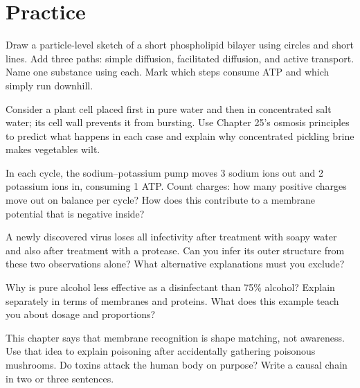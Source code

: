 \section*{Practice}

\begin{sikaoti}
\item Draw a particle-level sketch of a short phospholipid bilayer using circles and short lines. Add three paths: simple diffusion, facilitated diffusion, and active transport. Name one substance using each. Mark which steps consume ATP and which simply run downhill.
\item Consider a plant cell placed first in pure water and then in concentrated salt water; its cell wall prevents it from bursting. Use Chapter 25's osmosis principles to predict what happens in each case and explain why concentrated pickling brine makes vegetables wilt.
\item In each cycle, the sodium--potassium pump moves 3 sodium ions out and 2 potassium ions in, consuming 1 ATP. Count charges: how many positive charges move out on balance per cycle? How does this contribute to a membrane potential that is negative inside?
\item A newly discovered virus loses all infectivity after treatment with soapy water and also after treatment with a protease. Can you infer its outer structure from these two observations alone? What alternative explanations must you exclude?
\item Why is pure alcohol less effective as a disinfectant than 75\% alcohol? Explain separately in terms of membranes and proteins. What does this example teach you about dosage and proportions?
\item This chapter says that membrane recognition is shape matching, not awareness. Use that idea to explain poisoning after accidentally gathering poisonous mushrooms. Do toxins attack the human body on purpose? Write a causal chain in two or three sentences.
\end{sikaoti}
